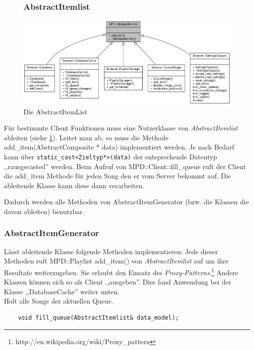 \newpage
\begin{figure}[htb!]
\subsubsection{AbstractItemlist}
    \centering
    \includegraphics[width=\textwidth]{AbstractItemlist.png}
    \caption{Die AbstractItemList}
    \label{c_abstract_item_list}
\end{figure}

Für bestimmte Client Funktionen muss eine Nutzerklasse von \emph{AbstractItemlist} ableiten (siehe \ref{c_abstract_item_list}).
Leitet man ab, so muss die Methode add\_item(AbstractComposite * data) implementiert werden. 
Je nach Bedarf kann über \verb+static_cast<Zieltyp*>(data)+ der entsprechende Datentyp ,,rausgecasted'' werden.
Beim Aufruf von MPD::Client::fill\_queue ruft der Client die add\_item Methode für jeden 
Song den er vom Server bekommt auf. Die ableitende Klasse kann diese dann verarbeiten.

Dadurch werden alle Methoden von AbstractItemGenerator (bzw. die Klassen die davon ableiten) benutzbar.

\subsubsection{AbstractItemGenerator}
%
%
%

Lässt ableitende Klasse folgende Methoden implementieren:
Jede dieser Methoden ruft MPD::Playlist add\_item() von \emph{AbstractItemlist} auf um ihre Resultate weiterzugeben.
Sie erlaubt den Einsatz des \emph{Proxy-Patterns}.\footnote{http://en.wikipedia.org/wiki/Proxy\_pattern}
Andere Klassen können sich so als Client ,,ausgeben''.
Dies fand Anwendung bei der Klasse ,,DatabaseCache'' weiter unten.
\\
Holt alle Songs der aktuellen Queue.
\begin{verbatim}            
    void fill_queue(AbstractItemlist& data_model);
\end{verbatim}

